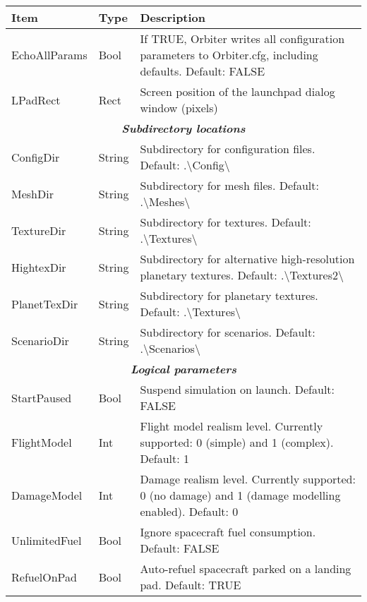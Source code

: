 \documentclass[Orbiter User Manual.tex]{subfiles}
\begin{document}
	\begin{longtable}{ |p{}|p{}|p{}| }
	\hline\rule{0pt}{2ex}
	\textbf{Item} & \textbf{Type} & \textbf{Description}\\
	\hline\rule{0pt}{2ex}
	EchoAllParams & Bool & If TRUE, Orbiter writes all configuration parameters to Orbiter.cfg, including defaults. Default: FALSE\\
	\hline\rule{0pt}{2ex}
	LPadRect & Rect & Screen position of the launchpad dialog window (pixels)\\
	\hline
	\multicolumn{3}{|c|}{\rule{0pt}{2ex}\textbf{\textit{Subdirectory locations}}}\\
	\hline\rule{0pt}{2ex}
	ConfigDir & String & Subdirectory for configuration files. Default: .\textbackslash Config\textbackslash\\
	\hline\rule{0pt}{2ex}
	MeshDir & String & Subdirectory for mesh files. Default: .\textbackslash Meshes\textbackslash\\
	\hline\rule{0pt}{2ex}
	TextureDir & String & Subdirectory for textures. Default: .\textbackslash Textures\textbackslash\\
	\hline\rule{0pt}{2ex}
	HightexDir & String & Subdirectory for alternative high-resolution planetary textures. Default: .\textbackslash Textures2\textbackslash\\
	\hline\rule{0pt}{2ex}
	PlanetTexDir & String & Subdirectory for planetary textures. Default: .\textbackslash Textures\textbackslash\\
	\hline\rule{0pt}{2ex}
	ScenarioDir & String & Subdirectory for scenarios. Default: .\textbackslash Scenarios\textbackslash\\
	\hline
	\multicolumn{3}{|c|}{\rule{0pt}{2ex}\textbf{\textit{Logical parameters}}}\\
	\hline\rule{0pt}{2ex}
	StartPaused & Bool & Suspend simulation on launch. Default: FALSE\\
	\hline\rule{0pt}{2ex}
	FlightModel & Int & Flight model realism level. Currently supported: 0 (simple) and 1 (complex). Default: 1\\
	\hline\rule{0pt}{2ex}
	DamageModel & Int & Damage realism level. Currently supported: 0 (no damage) and 1 (damage modelling enabled). Default: 0\\
	\hline\rule{0pt}{2ex}
	UnlimitedFuel & Bool & Ignore spacecraft fuel consumption. Default: FALSE\\
	\hline\rule{0pt}{2ex}
	RefuelOnPad & Bool & Auto-refuel spacecraft parked on a landing pad. Default: TRUE\\

\end{longtable}
\end{document}
